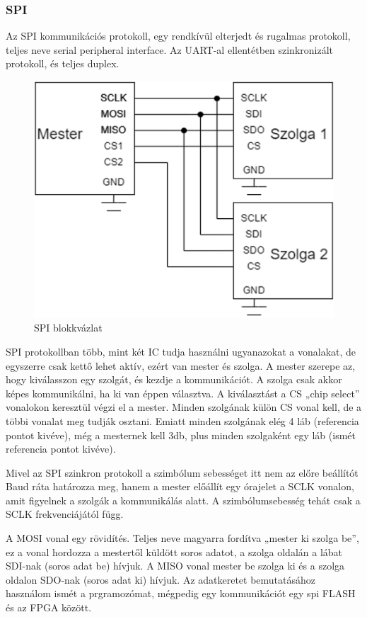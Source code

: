 \documentclass[a4paper,12pt,oneside]{book}
\begin{document}
\subsubsection{SPI}
Az SPI kommunikációs protokoll, egy rendkívül elterjedt és rugalmas protokoll, teljes neve serial peripheral interface. Az UART-al ellentétben szinkronizált protokoll, és teljes duplex.
\begin{figure}[H]
	\centering
	\includegraphics[trim=1mm 1mm 1mm 1mm,scale=0.5]{SPIblockk.PNG}
	\caption{SPI blokkvázlat}
	\label{SPI blokkvázlat}
\end{figure}
SPI protokollban több, mint két IC tudja használni ugyanazokat a vonalakat, de egyszerre csak kettő lehet aktív, ezért van mester és szolga. A mester szerepe az, hogy kiválasszon egy szolgát, és kezdje a kommunikációt. A szolga csak akkor képes kommunikálni, ha ki van éppen választva. A kiválasztást a CS „chip select” vonalokon keresztül végzi el a mester. Minden szolgának külön CS vonal kell, de a többi vonalat meg tudják osztani. Emiatt minden szolgának elég 4 láb (referencia pontot kivéve), még a mesternek kell 3db, plus minden szolgaként egy láb (ismét referencia pontot kivéve). 


Mivel az SPI szinkron protokoll a szimbólum sebességet itt nem az előre beállítót Baud ráta határozza meg, hanem a mester előállít egy órajelet a SCLK vonalon, amit figyelnek a szolgák a kommunikálás alatt. A szimbólumsebesség tehát csak a SCLK frekvenciájától függ. 


A MOSI vonal egy rövidítés. Teljes neve magyarra fordítva „mester ki szolga be”, ez a vonal hordozza a mestertől küldött soros adatot, a szolga oldalán a lábat SDI-nak (soros adat be) hívjuk. A MISO vonal mester be szolga ki és a szolga oldalon SDO-nak (soros adat ki) hívjuk. Az adatkeretet bemutatásához használom ismét a prgramozómat, mégpedig egy kommunikációt egy spi FLASH és az FPGA között.
\end{document}
